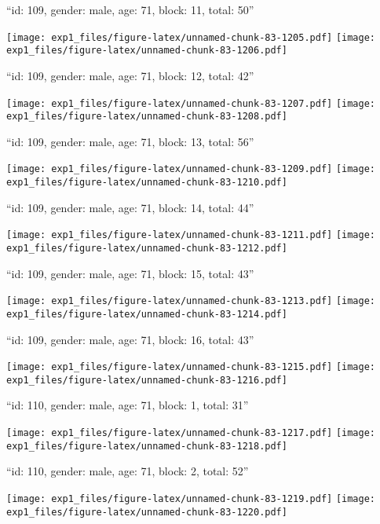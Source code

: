 \documentclass[11pt,,]{article}
\begin{document}
\newpage
[1] 

``id: 109, gender: male, age: 71, block: 11, total: 50''

\texttt{[image: exp1\_files/figure-latex/unnamed-chunk-83-1205.pdf]}
\texttt{[image: exp1\_files/figure-latex/unnamed-chunk-83-1206.pdf]}

\newpage
[1] 

``id: 109, gender: male, age: 71, block: 12, total: 42''

\texttt{[image: exp1\_files/figure-latex/unnamed-chunk-83-1207.pdf]}
\texttt{[image: exp1\_files/figure-latex/unnamed-chunk-83-1208.pdf]}

\newpage
[1] 

``id: 109, gender: male, age: 71, block: 13, total: 56''

\texttt{[image: exp1\_files/figure-latex/unnamed-chunk-83-1209.pdf]}
\texttt{[image: exp1\_files/figure-latex/unnamed-chunk-83-1210.pdf]}

\newpage
[1] 

``id: 109, gender: male, age: 71, block: 14, total: 44''

\texttt{[image: exp1\_files/figure-latex/unnamed-chunk-83-1211.pdf]}
\texttt{[image: exp1\_files/figure-latex/unnamed-chunk-83-1212.pdf]}

\newpage
[1] 

``id: 109, gender: male, age: 71, block: 15, total: 43''

\texttt{[image: exp1\_files/figure-latex/unnamed-chunk-83-1213.pdf]}
\texttt{[image: exp1\_files/figure-latex/unnamed-chunk-83-1214.pdf]}

\newpage
[1] 

``id: 109, gender: male, age: 71, block: 16, total: 43''

\texttt{[image: exp1\_files/figure-latex/unnamed-chunk-83-1215.pdf]}
\texttt{[image: exp1\_files/figure-latex/unnamed-chunk-83-1216.pdf]}

\newpage
[1] 

``id: 110, gender: male, age: 71, block: 1, total: 31''

\texttt{[image: exp1\_files/figure-latex/unnamed-chunk-83-1217.pdf]}
\texttt{[image: exp1\_files/figure-latex/unnamed-chunk-83-1218.pdf]}

\newpage
[1] 

``id: 110, gender: male, age: 71, block: 2, total: 52''

\texttt{[image: exp1\_files/figure-latex/unnamed-chunk-83-1219.pdf]}
\texttt{[image: exp1\_files/figure-latex/unnamed-chunk-83-1220.pdf]}
\end{document}
